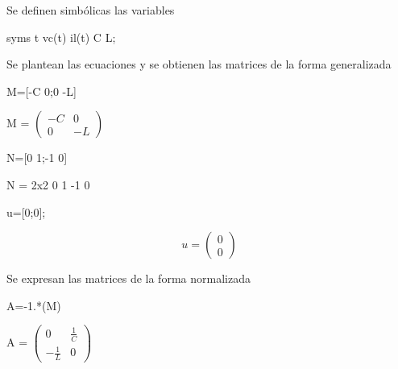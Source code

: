 \documentclass[10pt,a4paper]{article} %
\begin{document}
	\begin{par}
		\begin{flushleft}
			Se definen simbólicas las variables
		\end{flushleft}
	\end{par}
	
	\begin{matlabcode}
		syms t vc(t) il(t) C L;
	\end{matlabcode}
	
	\begin{par}
		\begin{flushleft}
			Se plantean las ecuaciones y se obtienen las matrices de la forma generalizada
		\end{flushleft}
	\end{par}
	
	\begin{matlabcode}
		M=[-C 0;0 -L]
	\end{matlabcode}

	\begin{matlabsymbolicoutput}
		M = 
		$\displaystyle \left(\begin{array}{cc}
		-C & 0\\
		0 & -L
		\end{array}\right)$
	\end{matlabsymbolicoutput}
	
	\begin{matlabcode}
		N=[0 1;-1 0]
	\end{matlabcode}
	\begin{matlaboutput}
		N = 2x2    
		0     1
		-1     0
		
	\end{matlaboutput}
	\begin{matlabcode}
		u=[0;0]; 
	\end{matlabcode}
	
	\begin{par}
		$$u=\begin{pmatrix}
		0\\0
		\end{pmatrix}$$
	\end{par}
	
	\begin{par}
		\begin{flushleft}
			Se expresan las matrices de la forma normalizada
		\end{flushleft}
	\end{par}
	
	\begin{matlabcode}
		A=-1.*(M\N)
	\end{matlabcode}
	\begin{matlabsymbolicoutput}
		A = 
		$\displaystyle \left(\begin{array}{cc}
		0 & \frac{1}{C}\\
		-\frac{1}{L} & 0
		\end{array}\right)$
	\end{matlabsymbolicoutput}
	
\end{document}
